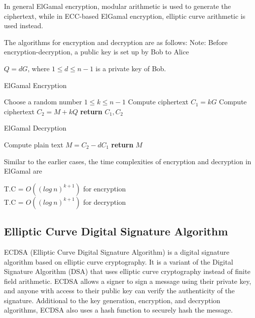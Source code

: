 \noindent
In general ElGamal encryption, modular arithmetic is used to generate the ciphertext, while in ECC-based ElGamal encryption, elliptic curve arithmetic is used instead.
\newpage

\noindent The algorithms for encryption and decryption are as follows:
\newline
\noindent Note: Before encryption-decryption, a public key is set up by Bob to Alice
\begin{center}
$Q = dG$, where $1 \leq d \leq n-1$ is a private key of Bob.
\end{center}

\begin{algorithm}
\caption{ElGamal Encryption}\label{elgamal-encrypt}
\begin{algorithmic}[1]
\State Choose a random number $1 \leq k \leq n-1$
\State Compute ciphertext $C_1 = kG$
\State Compute ciphertext $C_2 = M + kQ$
\State \textbf{return} $C_1, C_2$
\EndProcedure
\end{algorithmic}
\end{algorithm}

\begin{algorithm}
\caption{ElGamal Decryption}\label{elgamal-decrypt}
\begin{algorithmic}[1]
\State Compute plain text $M = C_2 - dC_1$
\State \textbf{return} $M$
\EndProcedure
\end{algorithmic}
\end{algorithm}

\noindent Similar to the earlier cases, the time complexities of encryption and decryption in ElGamal are
\begin{center}
    T.C = $O((log\:n)^{k+1})$ for encryption \\
    T.C = $O((log\:n)^{k+1})$ for decryption
\end{center}

\subsection{Elliptic Curve Digital Signature Algorithm}
ECDSA (Elliptic Curve Digital Signature Algorithm) is a digital signature algorithm based on elliptic curve cryptography. It is a variant of the Digital Signature Algorithm (DSA) that uses elliptic curve cryptography instead of finite field arithmetic.
ECDSA allows a signer to sign a message using their private key, and anyone with access to their public key can verify the authenticity of the signature. Additional to the key generation, encryption, and decryption algorithms, ECDSA also uses a hash function to securely hash the message. \newline

